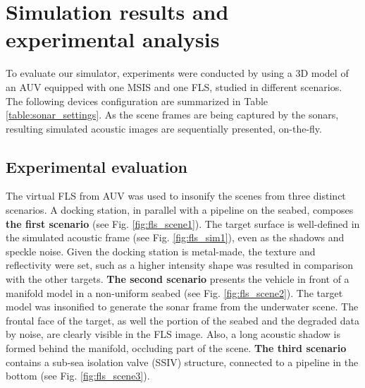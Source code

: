 \documentclass[final,5p,times]{elsarticle}
\begin{document}
\section{Simulation results and experimental analysis}
\label{results}

To evaluate our simulator, experiments were conducted by using a 3D model
of an AUV equipped with one MSIS and one FLS, studied in different scenarios.
The following devices configuration are summarized in
Table \ref{table:sonar_settings}. As the scene frames are being captured by
the sonars, resulting simulated acoustic images are sequentially presented,
on-the-fly.

\subsection{Experimental evaluation}

The virtual FLS from AUV was used to insonify the scenes from three distinct
scenarios. A docking station, in parallel with a pipeline on the seabed,
composes \textbf{the first scenario} (see Fig. \ref{fig:fls_scene1}). The
target surface is well-defined in the simulated acoustic frame (see
Fig. \ref{fig:fls_sim1}), even as the shadows and speckle noise. Given the
docking station is metal-made, the texture and reflectivity were set, such
as a higher intensity shape was resulted in comparison with the other targets.
\textbf{The second scenario} presents the vehicle in front of a manifold model
in a non-uniform seabed (see Fig. \ref{fig:fls_scene2}). The target model was
insonified to generate the sonar frame from the underwater scene. The frontal
face of the target, as well the portion of the seabed and the degraded data
by noise, are clearly visible in the FLS image. Also, a long acoustic shadow
is formed behind the manifold, occluding part of the scene. \textbf{The
third scenario} contains a sub-sea isolation valve (SSIV) structure, connected
to a pipeline in the bottom (see Fig. \ref{fig:fls_scene3}).
\end{document}
